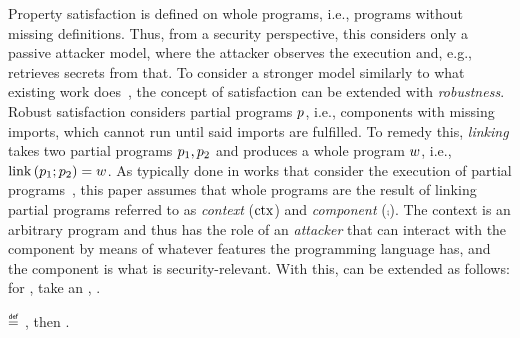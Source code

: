 \documentclass[dvipsnames]{llncs}
\begin{document}
Property satisfaction is defined on whole programs, i.e., programs without missing definitions.
Thus, from a security perspective, this considers only a passive attacker model, where the attacker observes the execution and, e.g., retrieves secrets from that.
To consider a stronger model similarly to what existing work does~\cite{abate2019jour,abate2021extacc,maffeis2008code-carrying,gordon2003authenticity,fournet2007authorization,bengtson2011refine,backes2014uniontyps,michael2023mswasm,swasey2017robust,sammler2019benefits}, the concept of satisfaction can be extended with {\em robustness}.
Robust satisfaction considers partial programs $\progvar$, i.e., components with missing imports, which cannot run until said imports are fulfilled.
To remedy this, {\em linking} takes two partial programs $\progvar[_{1}],\progvar[_{2}]$ and produces a whole program $\wholeprogvar$, i.e., $\link{\progvar[_{1}]}{\progvar[_{2}]}=\wholeprogvar$.
As typically done in works that consider the execution of partial programs~\cite{abate2019jour,devriese2018parametricity,patrignani2021rsc,korashy2021capableptrs,strydonck2019lincap,devriese2017modular,bowman2015noninterference,ahmed2011equivcps,patterson2017linkingtyps},
this paper assumes that whole programs are the result of linking partial programs referred to as {\em context} ($\ctx$) and {\em component} ($\comp$).
The context is an arbitrary program and thus has the role of an {\em attacker} that can interact with the component by means of whatever features the programming language has, and the component is what is security-relevant.
With this,  can be extended as follows: for , take an , .

\begin{definition}\label{def:proprsat}
  \bul{$\rsat{\progvar}{\pi}$}
  $\isdef$ , then \oul{$\sat{\wholeprogvar}{\pi}$}.
\end{definition}
\end{document}
